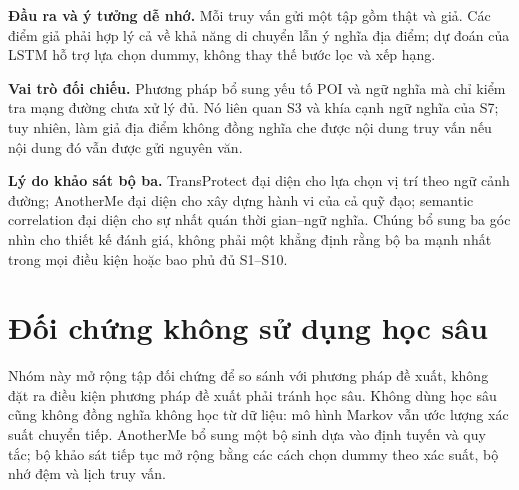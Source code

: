 \documentclass[12pt,a4paper,oneside]{report}
\begin{document}
\noindent\textbf{Đầu ra và ý tưởng dễ nhớ.}
Mỗi truy vấn gửi một tập gồm thật và giả. Các điểm giả phải hợp lý cả về khả năng di chuyển lẫn ý nghĩa địa điểm; dự đoán của LSTM hỗ trợ lựa chọn dummy, không thay thế bước lọc và xếp hạng.

\noindent\textbf{Vai trò đối chiếu.}
Phương pháp bổ sung yếu tố POI và ngữ nghĩa mà chỉ kiểm tra mạng đường chưa xử lý đủ. Nó liên quan S3 và khía cạnh ngữ nghĩa của S7; tuy nhiên, làm giả địa điểm không đồng nghĩa che được nội dung truy vấn nếu nội dung đó vẫn được gửi nguyên văn.

\medskip
\noindent\textbf{Lý do khảo sát bộ ba.}
TransProtect đại diện cho lựa chọn vị trí theo ngữ cảnh đường; AnotherMe đại diện cho xây dựng hành vi của cả quỹ đạo; semantic correlation đại diện cho sự nhất quán thời gian--ngữ nghĩa. Chúng bổ sung ba góc nhìn cho thiết kế đánh giá, không phải một khẳng định rằng bộ ba mạnh nhất trong mọi điều kiện hoặc bao phủ đủ S1--S10.

\clearpage

\section{Đối chứng không sử dụng học sâu}
\label{sec:non-neural}

Nhóm này mở rộng tập đối chứng để so sánh với phương pháp đề xuất, không đặt ra điều kiện phương pháp đề xuất phải tránh học sâu. Không dùng học sâu cũng không đồng nghĩa không học từ dữ liệu: mô hình Markov vẫn ước lượng xác suất chuyển tiếp. AnotherMe bổ sung một bộ sinh dựa vào định tuyến và quy tắc; bộ khảo sát tiếp tục mở rộng bằng các cách chọn dummy theo xác suất, bộ nhớ đệm và lịch truy vấn.
\end{document}
